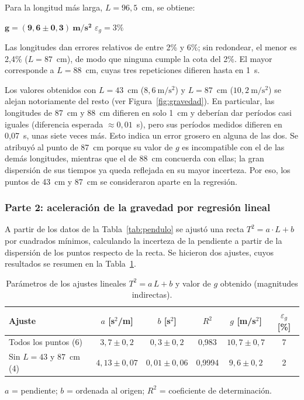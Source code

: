 \documentclass[12pt,a4paper]{article}
\newcommand{\hdr}[1]{\textbf{#1}}
\begin{document}
Para la longitud más larga, $L = 96{,}5$~cm, se obtiene:
\begin{center}
  $\boldsymbol{g = (9{,}6 \pm 0{,}3)\ \mathbf{m/s^2}}$
  \qquad $\varepsilon_g = 3\%$
\end{center}
Las longitudes dan errores relativos de entre 2\% y 6\%; sin redondear, el menor es 2,4\%
($L = 87$~cm), de modo que ninguna cumple la cota del 2\%. El mayor corresponde a
$L = 88$~cm, cuyas tres repeticiones difieren hasta en 1~s.

Los valores obtenidos con $L = 43$~cm ($8{,}6\ \mathrm{m/s^2}$) y $L = 87$~cm
($10{,}2\ \mathrm{m/s^2}$) se alejan notoriamente del resto (ver Figura~\ref{fig:gravedad}). En
particular, las longitudes de 87~cm y 88~cm difieren en solo 1~cm y deberían dar períodos
casi iguales (diferencia esperada $\approx 0{,}01$~s), pero sus períodos medidos difieren en
0,07~s, unas siete veces más. Esto indica un error grosero en alguna de las dos. Se atribuyó al punto de 87~cm
porque su valor de $g$ es incompatible con el de las demás longitudes, mientras que el de
88~cm concuerda con ellas; la gran dispersión de sus tiempos ya queda reflejada en su mayor
incerteza. Por eso, los puntos de 43~cm y 87~cm se consideraron aparte en la regresión.

\subsubsection*{Parte 2: aceleración de la gravedad por regresión lineal}
A partir de los datos de la Tabla~\ref{tab:pendulo} se ajustó una recta
$T^2 = a \cdot L + b$ por cuadrados mínimos, calculando la incerteza de la pendiente a partir
de la dispersión de los puntos respecto de la recta. Se hicieron dos ajustes, cuyos
resultados se resumen en la Tabla~\ref{tab:ajustes}.

\begin{table}[H]
\centering
\small
\caption{Parámetros de los ajustes lineales $T^2 = a\,L + b$ y valor de $g$ obtenido
         (magnitudes indirectas).}
\label{tab:ajustes}
\begin{tabular}{lccccc}
  \toprule
  \hdr{Ajuste} & \hdr{$a$ [s$^2$/m]} & \hdr{$b$ [s$^2$]} & \hdr{$R^2$} &
  \hdr{$g$ [m/s$^2$]} & \hdr{$\varepsilon_g$ [\%]} \\ \midrule
  Todos los puntos (6)              & $3{,}7 \pm 0{,}2$   & $0{,}3 \pm 0{,}2$   & 0,983  & $10{,}7 \pm 0{,}7$ & 7 \\
  Sin $L = 43$ y $87$~cm (4)        & $4{,}13 \pm 0{,}07$ & $0{,}01 \pm 0{,}06$ & 0,9994 & $9{,}6 \pm 0{,}2$  & 2 \\
  \bottomrule
\end{tabular}

\smallskip
{\footnotesize $a$ = pendiente; $b$ = ordenada al origen; $R^2$ = coeficiente de
determinación.}
\end{table}
\end{document}
